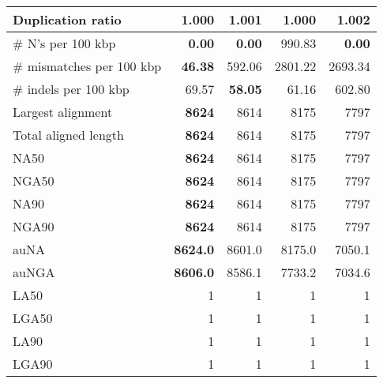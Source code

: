 \documentclass[12pt,a4paper]{article}
\begin{document}
\begin{table}[ht]
\begin{center}
\begin{tabular}{|l*{4}{|r}|}
Duplication ratio & {\bf 1.000} & 1.001 & {\bf 1.000} & 1.002 \\ \hline
\# N's per 100 kbp & {\bf 0.00} & {\bf 0.00} & 990.83 & {\bf 0.00} \\ \hline
\# mismatches per 100 kbp & {\bf 46.38} & 592.06 & 2801.22 & 2693.34 \\ \hline
\# indels per 100 kbp & 69.57 & {\bf 58.05} & 61.16 & 602.80 \\ \hline
Largest alignment & {\bf 8624} & 8614 & 8175 & 7797 \\ \hline
Total aligned length & {\bf 8624} & 8614 & 8175 & 7797 \\ \hline
NA50 & {\bf 8624} & 8614 & 8175 & 7797 \\ \hline
NGA50 & {\bf 8624} & 8614 & 8175 & 7797 \\ \hline
NA90 & {\bf 8624} & 8614 & 8175 & 7797 \\ \hline
NGA90 & {\bf 8624} & 8614 & 8175 & 7797 \\ \hline
auNA & {\bf 8624.0} & 8601.0 & 8175.0 & 7050.1 \\ \hline
auNGA & {\bf 8606.0} & 8586.1 & 7733.2 & 7034.6 \\ \hline
LA50 & 1 & 1 & 1 & 1 \\ \hline
LGA50 & 1 & 1 & 1 & 1 \\ \hline
LA90 & 1 & 1 & 1 & 1 \\ \hline
LGA90 & 1 & 1 & 1 & 1 \\ \hline
\end{tabular}
\end{center}
\end{table}
\end{document}

